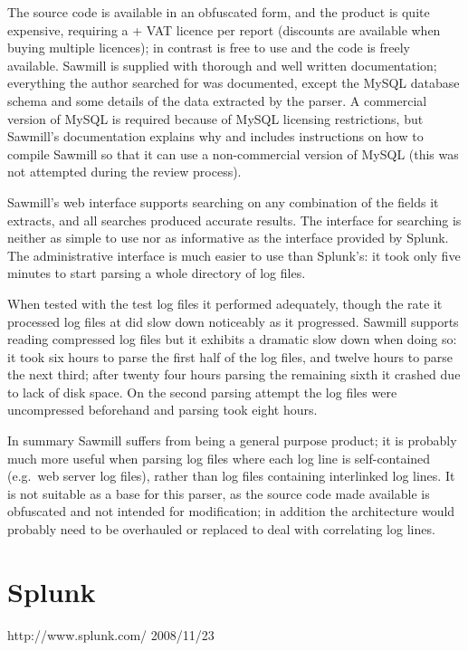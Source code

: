 The source code is available in an obfuscated form, and the product is
quite expensive, requiring a  + VAT licence per report
(discounts are available when buying multiple licences); in contrast
\parsername{} is free to use and the code is freely available.  Sawmill is
supplied with thorough and well written documentation; everything the
author searched for was documented, except the MySQL database schema and
some details of the data extracted by the parser.  A commercial version of
MySQL is required because of MySQL licensing restrictions, but Sawmill's
documentation explains why and includes instructions on how to compile
Sawmill so that it can use a non-commercial version of MySQL (this was not
attempted during the review process).

Sawmill's web interface supports searching on any combination of the fields
it extracts, and all searches produced accurate results.  The interface for
searching is neither as simple to use nor as informative as the interface
provided by Splunk.  The administrative interface is much easier to use
than Splunk's: it took only five minutes to start parsing a whole directory
of log files.  

When tested with the \numberOFlogFILES{} test log files it performed
adequately, though the rate it processed log files at did slow down
noticeably as it progressed.  Sawmill supports reading compressed log files
but it exhibits a dramatic slow down when doing so: it took six hours to
parse the first half of the log files, and twelve hours to parse the next
third; after twenty four hours parsing the remaining sixth it crashed due
to lack of disk space.  On the second parsing attempt the log files were
uncompressed beforehand and parsing took eight hours.

In summary Sawmill suffers from being a general purpose product; it is
probably much more useful when parsing log files where each log line is
self-contained (e.g.\ web server log files), rather than log files
containing interlinked log lines.  It is not suitable as a base for this
parser, as the source code made available is obfuscated and not intended
for modification; in addition the architecture would probably need to be
overhauled or replaced to deal with correlating log lines.

\section{Splunk}

{http://www.splunk.com/}
{2008/11/23}

